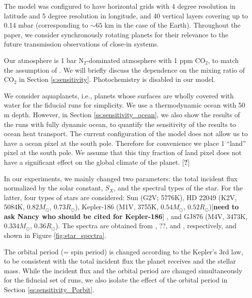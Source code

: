 \documentclass[11pt,numberedappendix,twocolappendix,]{emulateapj}
\def\memo#1{\color{red}$[${\bf #1}$]$ \color{black}}
\begin{document}
The model was configured to have horizontal grids with 4 degree resolution in latitude and 5 degree resolution in longitude, and 40 vertical layers covering up to 0.14 mbar (corresponding to $\sim 65$ km in the case of the Earth). 
Throughout the paper, we consider synchronously rotating planets for their  relevance to the future transmission observations of close-in systems. 

Our atmosphere is 1 bar N$_2$-dominated atmosphere with 1 ppm CO$_2$, to match the assumption of \citet{Kopparapu2016}. 
We will briefly discuss the dependence on the mixing ratio of CO$_2$ in Section \ref{s:sensitivity}. 
Photochemistry is disabled in our model. 

We consider aquaplanets, i.e., planets whose surfaces are wholly covered with water for the fiducial runs for simplicity. 
We use a thermodynamic ocean with 50 m depth. 
However, in Section \ref{ss:sensitivity_ocean}, we also show the results of the runs with fully dynamic ocean, to quantify the sensitivity of the results to ocean heat transport. 
The current configuration of the model does not allow us to have a ocean pixel at the south pole. Therefore for convenience we place 1 ``land'' pixel at the south pole. We assume that this tiny fraction of land pixel does not have a significant effect on the global climate of the planet. \memo{?}



In our experiments, we mainly changed two parameters: the total incident flux normalized by the solar constant, $S_X$, and the spectral types of the star. 
For the latter, four types of stars are considered: 
Sun (G2V; 5776K), 
HD 22049 (K2V, 5084K, $0.82M_{\odot }$, $0.73R_{\odot }$), 
Kepler-186 (M1V, 3755K, $0.54M_{\odot }$, $0.52R_{\odot }$)\memo{need to ask Nancy who should be cited for Kepler-186}, and 
GJ876 (M4V, 3473K, $0.334M_{\odot }$, $0.36R_{\odot }$). 
The spectra are obtained from \citet{Segura2003}, ??, and \citet{Domagal-Goldman2014}, respectively, and shown in Figure \ref{fig:star_spectra}. 

The orbital period (= spin period) is changed according to the Kepler's 3rd law, to be consistent with the total incident flux the planet receives and the stellar mass. While the incident flux and the orbital period are changed simultaneously for the fiducial set of runs, we also isolate the effect of the orbital period in Section \ref{ss:sensitivity_Porbit}. 
\end{document}
